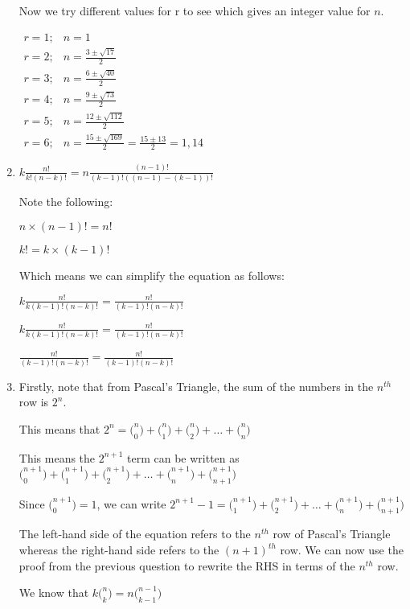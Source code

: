 \documentclass[../main.tex]{subfiles}
\begin{document}
\begin{enumerate}
    Now we try different values for r to see which gives an integer value for \(n\).
    
    $
    \begin{aligned}
    r=1; &n=1\\
    r=2; &n=\frac{3 \pm \sqrt{17}}{2}\\
    r=3; &n=\frac{6 \pm \sqrt{40}}{2}\\
    r=4; &n=\frac{9 \pm \sqrt{73}}{2}\\
    r=5; &n=\frac{12 \pm \sqrt{112}}{2}\\
    r=6; &n=\frac{15 \pm \sqrt{169}}{2}=\frac{15\pm 13}{2}=1,14
    \end{aligned}
    $

    \item
    \(k\frac{n!}{k!(n-k)!}=n\frac{(n-1)!}{(k-1)!((n-1)-(k-1))!} \)

    Note the following:

    \(n \times (n-1)! = n!\)

    \(k! = k \times (k-1)! \)

    Which means we can simplify the equation as follows:

    \(k\frac{n!}{k(k-1)!(n-k)!}=\frac{n!}{(k-1)!(n-k)!} \)

    \(k\frac{n!}{k(k-1)!(n-k)!}=\frac{n!}{(k-1)!(n-k)!} \)

    \(\frac{n!}{(k-1)!(n-k)!}=\frac{n!}{(k-1)!(n-k)!} \)

    \item 
    Firstly, note that from Pascal's Triangle, the sum of the numbers in the $n^{th}$ row is $2^n$.

    This means that $2^n = \bigl(^n_0\bigr)+\bigl(^n_1\bigr)+\bigl(^n_2\bigr)+\dots+\bigl(^n_n\bigr)$

    This means the $2^{n+1}$ term can be written as $\bigl(^{n+1}_0\bigr)+\bigl(^{n+1}_1\bigr)+\bigl(^{n+1}_2\bigr)+\dots+\bigl(^{n+1}_n\bigr)+\bigl(^{n+1}_{n+1}\bigr)$

    Since $\bigl(^{n+1}_0\bigr)=1$, we can write $2^{n+1}-1=\bigl(^{n+1}_1\bigr)+\bigl(^{n+1}_2\bigr)+\dots+\bigl(^{n+1}_n\bigr)+\bigl(^{n+1}_{n+1}\bigr)$

    The left-hand side of the equation refers to the $n^{th}$ row of Pascal's Triangle whereas the right-hand side refers to the $(n+1)^{th}$ row. We can now use the proof from the previous question to rewrite the RHS in terms of the $n^{th}$ row.

    We know that \(k\bigl(^n_k\bigr)=n\bigl(^{n-1}_{k-1}\bigr) \)


\end{enumerate}
\end{document}
